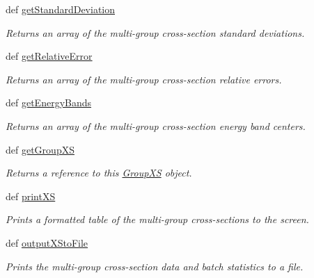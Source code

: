 \begin{DoxyCompactItemize}
def \hyperlink{classpinspec_1_1process_1_1GroupXS_af74a0da1fab21995e6105762aa21eed9}{get\-Standard\-Deviation}
\begin{DoxyCompactList}\small\item\em Returns an array of the multi-\/group cross-\/section standard deviations. \end{DoxyCompactList}\item 
def \hyperlink{classpinspec_1_1process_1_1GroupXS_a0adae8d5005d0534ccb3dcb3302bef6c}{get\-Relative\-Error}
\begin{DoxyCompactList}\small\item\em Returns an array of the multi-\/group cross-\/section relative errors. \end{DoxyCompactList}\item 
def \hyperlink{classpinspec_1_1process_1_1GroupXS_a9a56a3b63e126b65ce191ca7dbdcda32}{get\-Energy\-Bands}
\begin{DoxyCompactList}\small\item\em Returns an array of the multi-\/group cross-\/section energy band centers. \end{DoxyCompactList}\item 
def \hyperlink{classpinspec_1_1process_1_1GroupXS_aee3cc4641d6f9709c25cfa4e6fbbba08}{get\-Group\-X\-S}
\begin{DoxyCompactList}\small\item\em Returns a reference to this \hyperlink{classpinspec_1_1process_1_1GroupXS}{Group\-X\-S} object. \end{DoxyCompactList}\item 
def \hyperlink{classpinspec_1_1process_1_1GroupXS_a2918792badce34f95584a70d89aa71f7}{print\-X\-S}
\begin{DoxyCompactList}\small\item\em Prints a formatted table of the multi-\/group cross-\/sections to the screen. \end{DoxyCompactList}\item 
def \hyperlink{classpinspec_1_1process_1_1GroupXS_a6b64121b4d0efaf6b3e86587ecde0273}{output\-X\-Sto\-File}
\begin{DoxyCompactList}\small\item\em Prints the multi-\/group cross-\/section data and batch statistics to a file. \end{DoxyCompactList}\end{DoxyCompactItemize}
